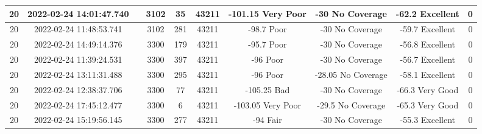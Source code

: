 \begin{longtable*}{|c|c|c|c|c|c|c|c|c|c|}
20&2022-02-24 14:01:47.740&&3102&35&43211& -101.15   Very Poor   & -30       No Coverage & -62.2     Excellent   & 0\\\hline
{}20&2022-02-24 11:48:53.741&&3102&281&43211& -98.7     Poor        & -30       No Coverage & -59.7     Excellent   & 0\\\hline
{}20&2022-02-24 14:49:14.376&&3300&179&43211& -95.7     Poor        & -30       No Coverage & -56.8     Excellent   & 0\\\hline
{}20&2022-02-24 11:39:24.531&&3300&397&43211& -96       Poor        & -30       No Coverage & -56.7     Excellent   & 0\\\hline
{}20&2022-02-24 13:11:31.488&&3300&295&43211& -96       Poor        & -28.05    No Coverage & -58.1     Excellent   & 0\\\hline
{}20&2022-02-24 12:38:37.706&&3300&77&43211& -105.25   Bad         & -30       No Coverage & -66.3     Very Good   & 0\\\hline
{}20&2022-02-24 17:45:12.477&&3300&6&43211& -103.05   Very Poor   & -29.5     No Coverage & -65.3     Very Good   & 0\\\hline
{}20&2022-02-24 15:19:56.145&&3300&277&43211& -94       Fair        & -30       No Coverage & -55.3     Excellent   & 0\\\hline

\end{longtable*}
